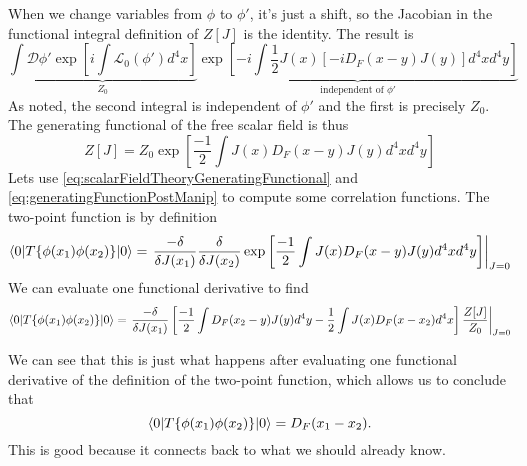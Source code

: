 When we change variables from $\phi$ to $\phi'$, it's just a
shift, so the Jacobian in the functional integral definition of
$Z[J]$ is the identity. The result is
\begin{equation}%
\underbrace{\int\mathcal{D}\phi'
\exp\left[i\int\mathcal{L}_{0}(\phi')d^{4}x\right]}_{Z_{0}}
\underbrace{\exp\left[-i\int\frac{1}{2}J(x)[-iD_{F}(x-y)J(y)]d^{4}xd^{4}y\right]}_{\text{independent of }\phi'}
\end{equation}
As noted, the second integral is independent of $\phi'$ and the
first is precisely $Z_{0}$. The generating functional of the free
scalar field is thus
\begin{equation}\label{eq:generatingFunctionPostManip}
Z[J] = Z_{0}\exp\left[\frac{-1}{2}\int J(x)D_{F}(x-y)J(y)d^{4}xd^{4}y\right]
\end{equation}
Lets use \eqref{eq:scalarFieldTheoryGeneratingFunctional} and
\eqref{eq:generatingFunctionPostManip} to compute some
correlation functions. The two-point function is by definition
\begin{equation}%
\<0|T\{\phi(x_1)\phi(x_2)\}|0\>
=\left.
\frac{-\delta}{\delta J(x_{1})}
\frac{\delta}{\delta J(x_{2})}
\exp\left[\frac{-1}{2}\int J(x)D_{F}(x-y)J(y)d^{4}xd^{4}y\right]\right|_{J=0}
\end{equation}
We can evaluate one functional derivative to find
\begin{equation}%
\<0|T\{\phi(x_1)\phi(x_2)\}|0\>
=\left.
\frac{-\delta}{\delta J(x_{1})}
\left[\frac{-1}{2}\int D_{F}(x_{2}-y)J(y)d^{4}y 
-\frac{1}{2}\int J(x)D_{F}(x-x_{2})d^{4}x
\right]
\frac{Z[J]}{Z_{0}}\right|_{J=0}
\end{equation}
\begin{comment}
We can see that the negatives cancel out nicely, we end up with 2
terms that effectively look like
\begin{equation*}%
\frac{-\delta}{\delta J(x_{1})}
\left[\frac{-1}{2}\int D_{F}(x_{2}-y)J(y)d^{4}y 
-\frac{1}{2}\int J(x)D_{F}(x-x_{2})d^{4}x
\right]
\propto
\frac{\delta}{\delta J(x_1)}\int D_{F}(x_2-y)J(y)d^{4}y
\end{equation*}
\end{comment}
We can see that this is just what happens after evaluating one
functional derivative of the definition of the two-point
function, which allows us to conclude that
\begin{equation}%
\<0|T\{\phi(x_1)\phi(x_2)\}|0\> = D_{F}(x_1-x_2).
\end{equation}
This is good because it connects back to what we should already know.

